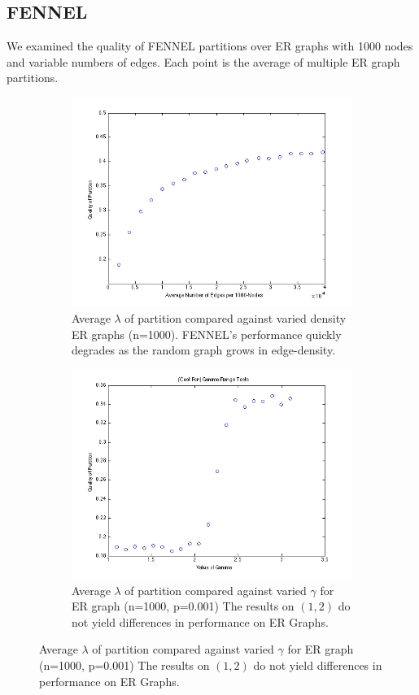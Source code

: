 \documentclass[11pt]{article}
\begin{document}
\subsection*{FENNEL} \vspace{-10 pt}
We examined the quality of FENNEL partitions over ER graphs with 1000 nodes and variable numbers of edges.
Each point is the average of multiple ER graph partitions.
\begin{figure}[ht]
\caption{FENNEL experiments investigating partition quality versus graph density and parameter choice.} 
\begin{subfigure}[b]{0.5\textwidth}
\caption{Average $\lambda$ of partition compared against varied density ER graphs (n=1000).  FENNEL's performance quickly degrades as the random graph grows in edge-density.}
\label{figure:quality}
\centering
\includegraphics[width=\textwidth] {figures/varied_er_p.png}
\end{subfigure}
\begin{subfigure}[b]{0.5\textwidth}
\caption{Average $\lambda$ of partition compared against varied $\gamma$ for ER graph (n=1000, p=0.001)  The results on $(1,2)$ do not yield differences in performance on ER Graphs.}
\label{figure:gamma}
\includegraphics[width=\textwidth] {figures/varied_gamma.png}
\end{subfigure}
\end{figure}
\end{document}
